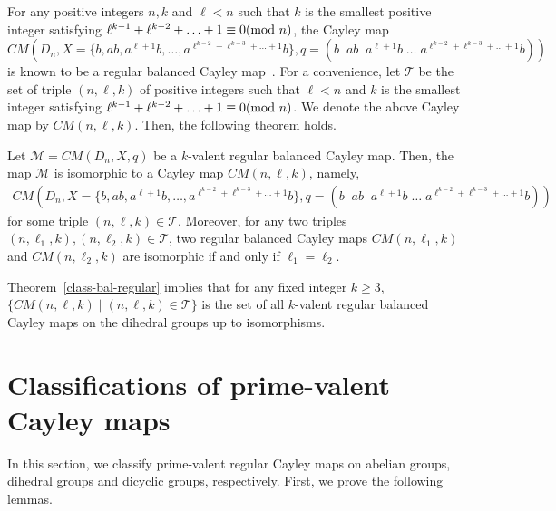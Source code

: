 \documentclass[12pt]{amsart}
\begin{document}
For any positive integers $n, k$ and $\ell < n$ such that $k$ is
the smallest positive integer satisfying
$\ell^{k-1}+\ell^{k-2}+\ldots+1 \equiv 0 ({\hbox{\rm mod }} n)$, the Cayley map
$$CM(D_n, X=\{b, ab, a^{\ell+1}b,\ldots,
a^{\ell^{k-2}+\ell^{k-3}+\ldots+1}b \}, q=(b
\;\;ab\;\;a^{\ell+1}b\; \ldots
\;a^{\ell^{k-2}+\ell^{k-3}+\ldots+1}b))$$ is known to be a regular
balanced Cayley map~\cite{WY}. For a convenience, let
$\mathcal{T}$ be the set of triple $(n, \ell, k)$ of positive
integers such that $\ell < n$  and $k$ is the smallest integer
satisfying $\ell^{k-1} + \ell^{k-2} + \ldots + 1 \equiv 0 ({\hbox{\rm mod }}
n)$.  We denote the above Cayley map by $CM(n, \ell, k)$. Then,
the following theorem holds.

\begin{theorem}[\cite{WY}] \label{class-bal-regular}
Let  $\mathcal{ M} =CM(D_n, X, q)$ be a $k$-valent regular balanced
Cayley map. Then, the map $\mathcal{ M}$ is isomorphic to a Cayley map
$CM(n,\ell,k)$, namely,
\begin{eqnarray*}CM(D_n, X=\{b, ab, a^{\ell+1}b,\ldots,
a^{\ell^{k-2}+\ell^{k-3}+\ldots+1}b \}, q=(b
\;\;ab\;\;a^{\ell+1}b\; \ldots \;
a^{\ell^{k-2}+\ell^{k-3}+\ldots+1}b))\end{eqnarray*} for some
triple $(n, \ell, k) \in \mathcal{T}$. Moreover, for any two
triples $(n, \ell_1, k), (n, \ell_2, k) \in \mathcal{T}$, two
regular balanced Cayley maps $CM(n, \ell_1, k)$ and  $CM(n,
\ell_2, k)$ are isomorphic if and only if $\ell_1 = \ell_2$.
\end{theorem}

 Theorem~\ref{class-bal-regular} implies that for any fixed integer $k \geq 3$, $\{ CM(n, \ell,
 k) \mid (n, \ell, k) \in \mathcal{T} \}$ is the set of all
  $k$-valent regular balanced Cayley maps on the dihedral
 groups up to isomorphisms.

\section{Classifications of prime-valent Cayley maps}\label{main}

In this section, we classify prime-valent regular Cayley maps on
abelian groups,  dihedral groups and dicyclic groups,
respectively. First, we prove the following lemmas.
\end{document}
